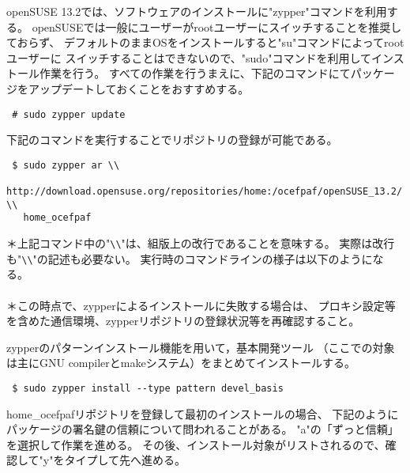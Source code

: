 openSUSE 13.2では、ソフトウェアのインストールに"zypper"コマンドを利用する。
openSUSEでは一般にユーザーがrootユーザーにスイッチすることを推奨しておらず、
デフォルトのままOSをインストールすると"su"コマンドによってrootユーザーに
スイッチすることはできないので、"sudo"コマンドを利用してインストール作業を行う。
すべての作業を行うまえに、下記のコマンドにてパッケージをアップデートしておくことをおすすめする。
\begin{verbatim}
 # sudo zypper update
\end{verbatim}

下記のコマンドを実行することでリポジトリの登録が可能である。
\begin{verbatim}
 $ sudo zypper ar \\
   http://download.opensuse.org/repositories/home:/ocefpaf/openSUSE_13.2/ \\
   home_ocefpaf
\end{verbatim}
{\small ＊上記コマンド中の"\verb|\\|"は、組版上の改行であることを意味する。
実際は改行も"\verb|\\|"の記述も必要ない。}
実行時のコマンドラインの様子は以下のようになる。\\

{\small {\gt
{}}}\\

{\small ＊この時点で、zypperによるインストールに失敗する場合は、
プロキシ設定等を含めた通信環境、zypperリポジトリの登録状況等を再確認すること。}

\noindent zypperのパターンインストール機能を用いて，基本開発ツール
（ここでの対象は主にGNU compilerとmakeシステム）をまとめてインストールする。
\begin{verbatim}
 $ sudo zypper install --type pattern devel_basis
\end{verbatim}

home\_ocefpafリポジトリを登録して最初のインストールの場合、
下記のようにパッケージの署名鍵の信頼について問われることがある。
"a"の「ずっと信頼」を選択して作業を進める。
その後、インストール対象がリストされるので、確認して"y"をタイプして先へ進める。\\

